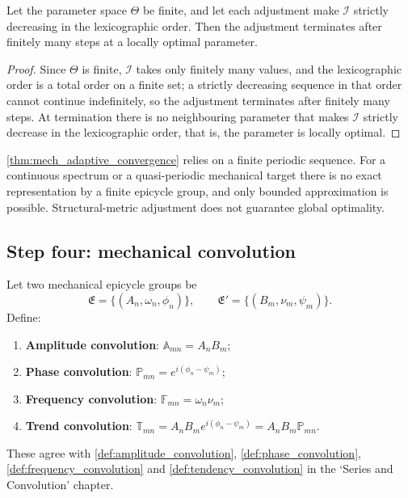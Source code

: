 \begin{proposition}\label{prop:mech_structure_metric_convergence}
Let the parameter space $\Theta$ be finite, and let each adjustment make $\mathcal I$ strictly decreasing in the lexicographic order. Then the adjustment terminates after finitely many steps at a locally optimal parameter.
\end{proposition}

\begin{proof}
Since $\Theta$ is finite, $\mathcal I$ takes only finitely many values, and the lexicographic order is a total order on a finite set; a strictly decreasing sequence in that order cannot continue indefinitely, so the adjustment terminates after finitely many steps. At termination there is no neighbouring parameter that makes $\mathcal I$ strictly decrease in the lexicographic order, that is, the parameter is locally optimal.
\end{proof}

\begin{remark}\label{rem:mech_adaptive_boundary}
\cref{thm:mech_adaptive_convergence} relies on a finite periodic sequence. For a continuous spectrum or a quasi-periodic mechanical target there is no exact representation by a finite epicycle group, and only bounded approximation is possible. Structural-metric adjustment does not guarantee global optimality.
\end{remark}

\subsection{Step four: mechanical convolution}

\begin{definition}\label{def:mech_convolution_types}
Let two mechanical epicycle groups be
\[
\mathfrak E=\{(A_n,\omega_n,\phi_n)\},\qquad
\mathfrak E'=\{(B_m,\nu_m,\psi_m)\}.
\]
Define:
\begin{enumerate}[label=(\roman*)]
    \item \textbf{Amplitude convolution}: $\mathbb A_{mn}=A_nB_m$;
    \item \textbf{Phase convolution}: $\mathbb P_{mn}=e^{i(\phi_n-\psi_m)}$;
    \item \textbf{Frequency convolution}: $\mathbb F_{mn}=\omega_n\nu_m$;
    \item \textbf{Trend convolution}: $\mathbb T_{mn}=A_nB_m e^{i(\phi_n-\psi_m)}=A_nB_m\mathbb P_{mn}$.
\end{enumerate}
These agree with \cref{def:amplitude_convolution}, \cref{def:phase_convolution}, \cref{def:frequency_convolution} and \cref{def:tendency_convolution} in the `Series and Convolution' chapter.
\end{definition}

